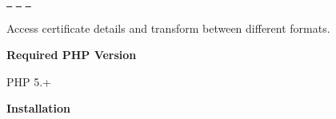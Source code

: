 \href{https://travis-ci.org/kelunik/certificate}{\texttt{ }} \href{https://coveralls.io/github/kelunik/certificate?branch=master}{\texttt{ }} \href{https://github.com/kelunik/certificate/blob/master/LICENSE}{\texttt{ }}

Access certificate details and transform between different formats.

{\bfseries{Required PHP Version}}


\begin{DoxyItemize}
\item PHP 5.+
\end{DoxyItemize}

{\bfseries{Installation}}


\begin{DoxyCode}{0}

\end{DoxyCode}
 
